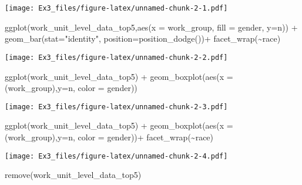 \documentclass[
]{article}
\newenvironment{Shaded}{\begin{snugshade}}{\end{snugshade}}
\newcommand{\AttributeTok}[1]{\textcolor[rgb]{0.77,0.63,0.00}{#1}}
\newcommand{\FunctionTok}[1]{\textcolor[rgb]{0.00,0.00,0.00}{#1}}
\newcommand{\NormalTok}[1]{#1}
\newcommand{\SpecialCharTok}[1]{\textcolor[rgb]{0.00,0.00,0.00}{#1}}
\newcommand{\StringTok}[1]{\textcolor[rgb]{0.31,0.60,0.02}{#1}}
\begin{document}
\texttt{[image: Ex3\_files/figure-latex/unnamed-chunk-2-1.pdf]}

\begin{Shaded}
\begin{Highlighting}[]
\FunctionTok{ggplot}\NormalTok{(work\_unit\_level\_data\_top5,}\FunctionTok{aes}\NormalTok{(}\AttributeTok{x =}\NormalTok{ work\_group, }\AttributeTok{fill =}\NormalTok{ gender, }\AttributeTok{y=}\NormalTok{n)) }\SpecialCharTok{+}
  \FunctionTok{geom\_bar}\NormalTok{(}\AttributeTok{stat=}\StringTok{"identity"}\NormalTok{, }\AttributeTok{position=}\FunctionTok{position\_dodge}\NormalTok{())}\SpecialCharTok{+}
  \FunctionTok{facet\_wrap}\NormalTok{(}\SpecialCharTok{\textasciitilde{}}\NormalTok{race)}
\end{Highlighting}
\end{Shaded}

\texttt{[image: Ex3\_files/figure-latex/unnamed-chunk-2-2.pdf]}

\begin{Shaded}
\begin{Highlighting}[]
\FunctionTok{ggplot}\NormalTok{(work\_unit\_level\_data\_top5) }\SpecialCharTok{+}
  \FunctionTok{geom\_boxplot}\NormalTok{(}\FunctionTok{aes}\NormalTok{(}\AttributeTok{x =}\NormalTok{ (work\_group),}\AttributeTok{y=}\NormalTok{n, }\AttributeTok{color =}\NormalTok{ gender))}
\end{Highlighting}
\end{Shaded}

\texttt{[image: Ex3\_files/figure-latex/unnamed-chunk-2-3.pdf]}

\begin{Shaded}
\begin{Highlighting}[]
\FunctionTok{ggplot}\NormalTok{(work\_unit\_level\_data\_top5) }\SpecialCharTok{+}
  \FunctionTok{geom\_boxplot}\NormalTok{(}\FunctionTok{aes}\NormalTok{(}\AttributeTok{x =}\NormalTok{ (work\_group),}\AttributeTok{y=}\NormalTok{n, }\AttributeTok{color =}\NormalTok{ gender))}\SpecialCharTok{+}
  \FunctionTok{facet\_wrap}\NormalTok{(}\SpecialCharTok{\textasciitilde{}}\NormalTok{race)}
\end{Highlighting}
\end{Shaded}

\texttt{[image: Ex3\_files/figure-latex/unnamed-chunk-2-4.pdf]}

\begin{Shaded}
\begin{Highlighting}[]
\FunctionTok{remove}\NormalTok{(work\_unit\_level\_data\_top5)}
\end{Highlighting}
\end{Shaded}
\end{document}
